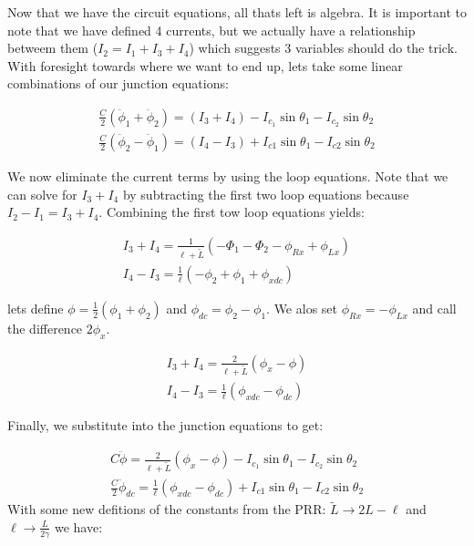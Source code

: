 \documentclass[paper=a4, twocolumn, fontsize=10pt]{article} %
\numberwithin{equation}{section} %
\numberwithin{figure}{section} %
\numberwithin{table}{section} %
\begin{document}
Now that we have the circuit equations, all thats left is algebra. It is important to note that we have defined 4 currents, but we actually have a relationship betweem them ($I_2 = I_1 + I_3 + I_4$) which suggests 3 variables should do the trick. With foresight towards where we want to end up, lets take some linear combinations of our junction equations:

\begin{align}
\frac{C}{2} (\ddot{\phi}_1 + \ddot{\phi}_2 ) = (I_3 + I_4) - I_{c_1} \sin \theta_1 - I_{c_2} \sin \theta_2
\\
\frac{C}{2} (\ddot{\phi}_2 - \ddot{\phi}_1 ) = (I_4 - I_3) +I_{c1} \sin\theta_1 - I_{c2} \sin \theta_2
\end{align}

We now eliminate the current terms by using the loop equations. Note that we can solve for $I_3+I_4$ by subtracting the first two loop equations because $I_2 - I_1 = I_3+I_4$. Combining the first tow loop equations yields:

\begin{align}
    I_3 + I_4 = \frac{1}{\ell+\tilde{L}}\left(- \Phi_1 - \Phi_2 - \phi_{Rx} + \phi_{Lx} \right)
    \\
    I_4 - I_3 =\frac{1}{\ell}\left( -\phi_2 + \phi_1 +\phi_{xdc}\right)
    \end{align}


lets define $\phi = \frac{1}{2}\left(\phi_1 + \phi_2\right)$ and $\phi_{dc} = \phi_2 - \phi_1$. We alos set $\phi_{Rx} = -\phi_{Lx}$ and call the difference $2\phi_{x}$.

\begin{align}
    I_3 + I_4 = \frac{2}{\ell+\tilde{L}}\left(\phi_x - \phi \right)
    \\
    I_4 - I_3 =\frac{1}{\ell}\left(\phi_{xdc} - \phi_{dc} \right)
    \end{align}

Finally, we substitute into the junction equations to get:


\begin{align}
    C \ddot{\phi} = \frac{2}{\ell+\tilde{L}}\left( \phi_x - \phi \right) - I_{c_1} \sin \theta_1 - I_{c_2} \sin \theta_2
    \\
    \frac{C}{2} \ddot{\phi}_{dc}= \frac{1}{\ell}\left( \phi_{xdc} -\phi_{dc}\right) +I_{c1} \sin\theta_1 - I_{c2} \sin \theta_2
    \end{align}
With some new defitions of the constants from the PRR: $\tilde{L}\to 2L-\ell$ and $\ell \to \frac{L}{2\gamma}$ we have:
\end{document}
